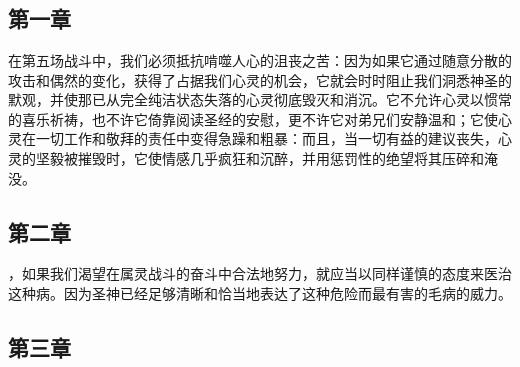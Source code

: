 
\section{}


\subsection{第一章}

\par

在第五场战斗中，我们必须抵抗啃噬人心的沮丧之苦：因为如果它通过随意分散的攻击和偶然的变化，获得了占据我们心灵的机会，它就会时时阻止我们洞悉神圣的默观，并使那已从完全纯洁状态失落的心灵彻底毁灭和消沉。它不允许心灵以惯常的喜乐祈祷，也不许它倚靠阅读圣经的安慰，更不许它对弟兄们安静温和；它使心灵在一切工作和敬拜的责任中变得急躁和粗暴：而且，当一切有益的建议丧失，心灵的坚毅被摧毁时，它使情感几乎疯狂和沉醉，并用惩罚性的绝望将其压碎和淹没。\par


\subsection{第二章}

\par

，如果我们渴望在属灵战斗的奋斗中合法地努力，就应当以同样谨慎的态度来医治这种病。因为圣神已经足够清晰和恰当地表达了这种危险而最有害的毛病的威力。\par


\subsection{第三章}

\par

